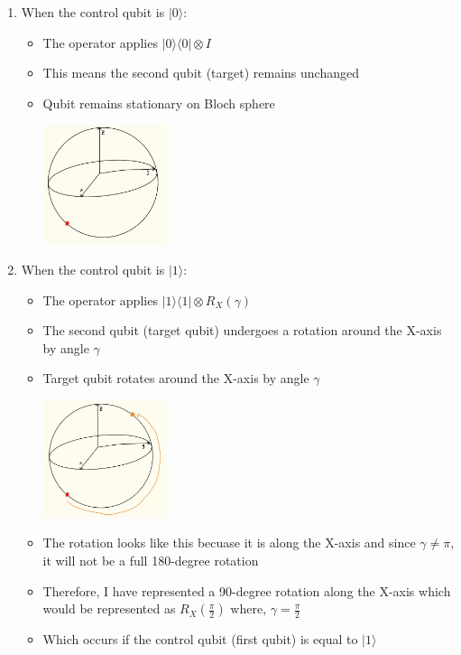 \documentclass[12pt]{article}
\begin{document}
\begin{enumerate}
    \item When the control qubit is $|0\rangle$:
    \begin{itemize}
        \item The operator applies $|0\rangle \langle 0| \otimes I$
        \item This means the second qubit (target) remains unchanged
        \item Qubit remains stationary on Bloch sphere
        \begin{center}
            \includegraphics[width=0.3\textwidth]{case_one.jpeg}
        \end{center}
    \end{itemize}
    \item When the control qubit is $|1\rangle$:
    \begin{itemize}
        \item The operator applies $|1\rangle \langle 1| \otimes R_X (\gamma)$
        \item The second qubit (target qubit) undergoes a rotation around the X-axis by angle $\gamma$
        \item Target qubit rotates around the X-axis by angle $\gamma$
        \begin{center}
            \includegraphics[width=0.3\textwidth]{case_two.jpeg}
        \end{center}
        \item The rotation looks like this becuase it is along the X-axis and since $\gamma \neq \pi$, it will not be a full 180-degree rotation
        \item Therefore, I have represented a 90-degree rotation along the X-axis which would be represented as $R_X (\frac{\pi}{2}) \text{ where, } \gamma = \frac{\pi}{2}$
        \item Which occurs if the control qubit (first qubit) is equal to $|1\rangle$
    \end{itemize}
\end{enumerate}

\end{document}
